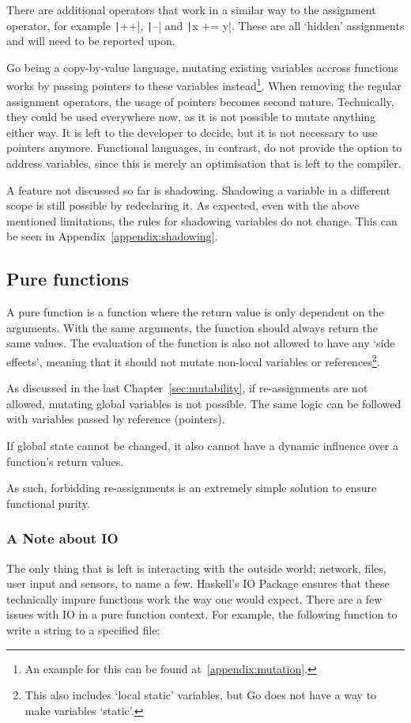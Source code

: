 There are additional operators that work in a similar way to the assignment
operator, for example \texttt|++|, \texttt|--| and
\texttt|x += y|. These are all `hidden' assignments and will need to
be reported upon.

Go being a \gls{copy-by-value} language, mutating existing variables
    accross functions works by passing pointers to these variables instead\footnote{
        An example for this can be found at~\ref{appendix:mutation}.}.
When removing the regular assignment operators, the usage of pointers becomes
second nature. Technically, they could be used everywhere now, as it is not
possible to mutate anything either way. It is left to the developer to decide,
but it is not necessary to use pointers anymore. Functional languages, in contrast,
do not provide the option to address variables, since this is merely an optimisation
that is left to the compiler.

A feature not discussed so far is shadowing. Shadowing a variable in a different
scope is still possible by redeclaring it. As expected, even with the above
mentioned limitations, the rules for shadowing variables do not change. This
can be seen in Appendix~\ref{appendix:shadowing}.

\subsection{Pure functions}

A pure function is a function where the return value is only dependent on
the arguments. With the same arguments, the function should always return
the same values. The evaluation of the function is also not allowed to have
any `side effects', meaning that it should not mutate non-local variables or
references\footnote{This also includes `local static' variables, but Go does
not have a way to make variables `static'.}.

As discussed in the last Chapter~\ref{sec:mutability}, if re-assignments
are not allowed, mutating global variables is not possible. The same logic
can be followed with variables passed by reference (pointers).

If global state cannot be changed, it also cannot have a dynamic influence
over a function's return values.

As such, forbidding re-assignments is an extremely simple solution to
ensure functional purity.

\subsubsection{A Note about IO}
The only thing that is left is interacting with the outside world; network,
files, user input and sensors, to name a few. Haskell's IO Package ensures
that these technically impure functions work the way one would expect.
There are a few issues with IO in a pure function context. For example,
the following function to write a string to a specified file:

